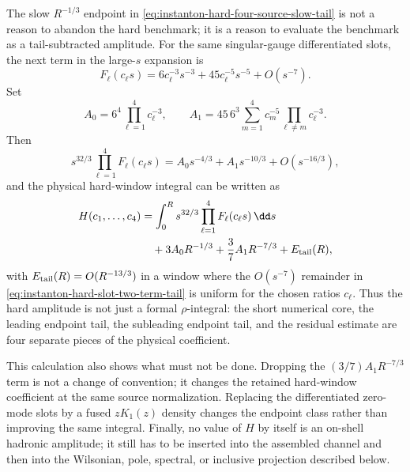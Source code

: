 \begin{controlledapproximation}
\label{ca:instanton-hard-window-tail-subtraction}
The slow \(R^{-1/3}\) endpoint in
\eqref{eq:instanton-hard-four-source-slow-tail} is not a reason to abandon
the hard benchmark; it is a reason to evaluate the benchmark as a
tail-subtracted amplitude.  For the same singular-gauge differentiated slots,
the next term in the large-\(s\) expansion is
\begin{equation}
  F_\ell(c_\ell s)
  =
  6c_\ell^{-3}s^{-3}
  +
  45c_\ell^{-5}s^{-5}
  +O(s^{-7}).
  \label{eq:instanton-hard-slot-two-term-tail}
\end{equation}
Set
\[
  A_0=6^4\prod_{\ell=1}^4c_\ell^{-3},
  \qquad
  A_1
  =
  45\,6^3
  \sum_{m=1}^{4}
  c_m^{-5}\prod_{\ell\ne m}c_\ell^{-3}.
\]
Then
\begin{equation}
  s^{32/3}\prod_{\ell=1}^4F_\ell(c_\ell s)
  =
  A_0s^{-4/3}+A_1s^{-10/3}+O(s^{-16/3}),
  \label{eq:instanton-hard-window-two-term-integrand-tail}
\end{equation}
and the physical hard-window integral can be written as
\begin{equation}
\begin{aligned}
  H(c_1,\ldots,c_4)
  &=
  \int_0^R
    s^{32/3}\prod_{\ell=1}^{4}F_\ell(c_\ell s)\,\dd s       \\
  &\quad
  +3A_0R^{-1/3}
  +\frac37A_1R^{-7/3}
  +E_{\rm tail}(R),
\end{aligned}
  \label{eq:instanton-hard-window-tail-subtracted-integral}
\end{equation}
with \(E_{\rm tail}(R)=O(R^{-13/3})\) in a window where the
\(O(s^{-7})\) remainder in \eqref{eq:instanton-hard-slot-two-term-tail} is
uniform for the chosen ratios \(c_\ell\).  Thus the hard amplitude is not just
a formal \(\rho\)-integral: the short numerical core, the leading endpoint
tail, the subleading endpoint tail, and the residual estimate are four
separate pieces of the physical coefficient.

This calculation also shows what must not be done.  Dropping the
\((3/7)A_1R^{-7/3}\) term is not a change of convention; it changes the
retained hard-window coefficient at the same source normalization.  Replacing
the differentiated zero-mode slots by a fused \(zK_1(z)\) density changes the
endpoint class rather than improving the same integral.  Finally, no value of
\(H\) by itself is an on-shell hadronic amplitude; it still has to be inserted
into the assembled channel and then into the Wilsonian, pole, spectral, or
inclusive projection described below.
\end{controlledapproximation}

